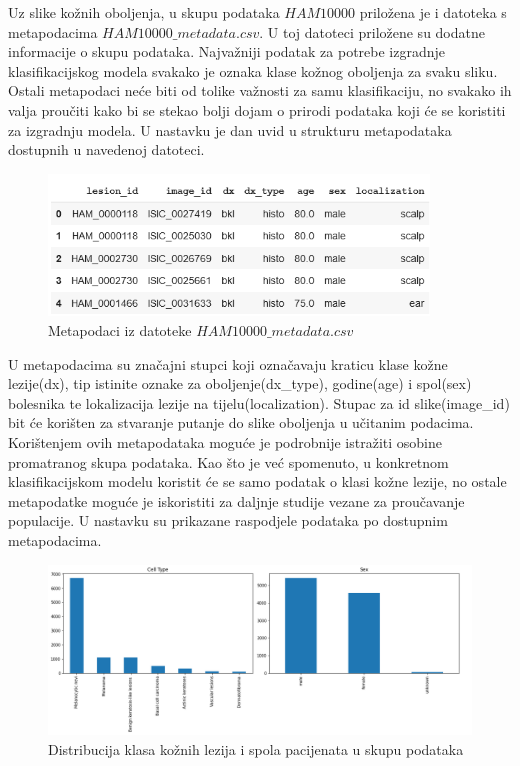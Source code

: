 \documentclass[times, utf8, zavrsni]{fer}
\begin{document}
Uz slike kožnih oboljenja, u skupu podataka $HAM10000$ priložena je i datoteka s metapodacima $HAM10000\_metadata.csv$. U toj datoteci priložene su dodatne informacije o skupu podataka. Najvažniji podatak za potrebe izgradnje klasifikacijskog modela svakako je oznaka klase kožnog oboljenja za svaku sliku. Ostali metapodaci neće biti od tolike važnosti za samu klasifikaciju, no svakako ih valja proučiti kako bi se stekao bolji dojam o prirodi podataka koji će se koristiti za izgradnju modela. U nastavku je dan uvid u strukturu metapodataka dostupnih u navedenoj datoteci.
\newpage
%  
\begin{figure}[!h]
\centering
\includegraphics[width=0.9\textwidth]{./slike/colab1}
\caption{Metapodaci iz datoteke $HAM10000\_metadata.csv$}
\label{fig:colab1}
\end{figure}
%
\indent{}
U metapodacima su značajni stupci koji označavaju kraticu klase kožne lezije(dx), tip istinite oznake za oboljenje(dx\_type), godine(age) i spol(sex) bolesnika te lokalizacija lezije na tijelu(localization). Stupac za id slike(image\_id) bit će korišten za stvaranje putanje do slike oboljenja u učitanim podacima.\\
\indent{}
Korištenjem ovih metapodataka moguće je podrobnije istražiti osobine promatranog skupa podataka. Kao što je već spomenuto, u konkretnom klasifikacijskom modelu koristit će se samo podatak o klasi kožne lezije, no ostale metapodatke moguće je iskoristiti za daljnje studije vezane za proučavanje populacije. U nastavku su prikazane raspodjele podataka po dostupnim metapodacima.
%
\begin{figure}[!h]
\hspace{-0.1\textwidth}
\includegraphics[width=1.2\textwidth]{./slike/colab2}
\caption{Distribucija klasa kožnih lezija i spola pacijenata u skupu podataka}
\label{fig:colab2}
\end{figure}
\end{document}
